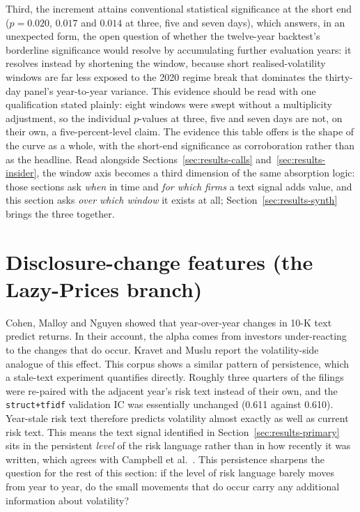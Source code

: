 \documentclass[logo,msc,ai]{infthesis}        %
\begin{document}
Third, the increment attains conventional statistical significance at the short end ($p=0.020$, $0.017$ and $0.014$ at three, five and seven days), which answers, in an unexpected form, the open question of whether the twelve-year backtest's borderline significance would resolve by accumulating further evaluation years: it resolves instead by shortening the window, because short realised-volatility windows are far less exposed to the 2020 regime break that dominates the thirty-day panel's year-to-year variance. This evidence should be read with one qualification stated plainly: eight windows were swept without a multiplicity adjustment, so the individual $p$-values at three, five and seven days are not, on their own, a five-percent-level claim. The evidence this table offers is the shape of the curve as a whole, with the short-end significance as corroboration rather than as the headline. Read alongside Sections~\ref{sec:results-calls} and~\ref{sec:results-insider}, the window axis becomes a third dimension of the same absorption logic: those sections ask \emph{when} in time and \emph{for which firms} a text signal adds value, and this section asks \emph{over which window} it exists at all; Section~\ref{sec:results-synth} brings the three together.

\section{Disclosure-change features (the Lazy-Prices branch)}
\label{sec:results-change}
Cohen, Malloy and Nguyen \cite{cohen2020lazy} showed that year-over-year changes in 10-K text predict returns. In their account, the alpha comes from investors under-reacting to the changes that do occur. Kravet and Muslu \cite{kravet2013textual} report the volatility-side analogue of this effect. This corpus shows a similar pattern of persistence, which a stale-text experiment quantifies directly. Roughly three quarters of the filings were re-paired with the adjacent year's risk text instead of their own, and the \texttt{struct+tfidf} validation IC was essentially unchanged (0.611 against 0.610). Year-stale risk text therefore predicts volatility almost exactly as well as current risk text. This means the text signal identified in Section~\ref{sec:results-primary} sits in the persistent \emph{level} of the risk language rather than in how recently it was written, which agrees with Campbell et al.\ \cite{campbell2014information}. This persistence sharpens the question for the rest of this section: if the level of risk language barely moves from year to year, do the small movements that do occur carry any additional information about volatility?
\end{document}
